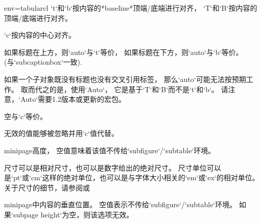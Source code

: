 \begin{tableobject}{env=tabular}{cl}
  `t`和`b`按内容的*baseline*顶端\slash 底端进行对齐，
  `T`和`B`按内容的顶端\slash 底端进行对齐。

  `c`按内容的中心对齐。

  如果标题在上方，则`auto`与`t`等价，
  如果标题在下方，则`auto`与`b`等价。
  (与`subcaptionbox`一致).

  如果一个子对象既没有标题也没有交叉引用标签，
  那么`auto`可能无法按预期工作。
  取而代之的是，使用`Auto`，
  它是基于`T`和`B`而不是`t`和`b`。
  请注意，`Auto`需要1.2版本或更新的宏包。

  空与`c`等价。

  无效的值能够被忽略并用`c`值代替。


  minipage高度，
  空值意味着该值不传给`subfigure`\slash `subtable`环境。

  尺寸可以是相对尺寸，也可以是数字给出的绝对尺寸。
  尺寸单位可以是`pt`或`cm`这样的绝对单位，也可以是与字体大小相关的`em`或`ex`的相对单位。
  关于尺寸的细节，请参阅或

  minipage中内容的垂直位置。
  空值表示不传给`subfigure`\slash `subtable`环境。
  如果`subpage height`为空，则该选项无效。


\end{tableobject}
